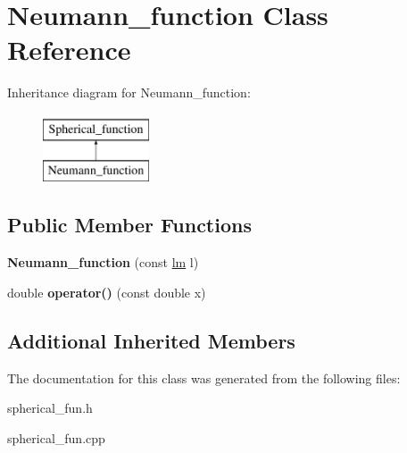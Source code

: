 \hypertarget{classNeumann__function}{}\section{Neumann\+\_\+function Class Reference}
\label{classNeumann__function}
Inheritance diagram for Neumann\+\_\+function\+:\begin{figure}[H]
\begin{center}
\leavevmode
\includegraphics[height=2.000000cm]{classNeumann__function}
\end{center}
\end{figure}
\subsection*{Public Member Functions}
\begin{DoxyCompactItemize}
\item 
\mbox{\label{classNeumann__function_aa4aefbe0c19a40d5aa39f4a5d5c23473}} 
{\bfseries Neumann\+\_\+function} (const \hyperlink{structlm}{lm} l)
\item 
\mbox{\label{classNeumann__function_a423faa23869a1e6c1071ccc8e35a2258}} 
double {\bfseries operator()} (const double x)
\end{DoxyCompactItemize}
\subsection*{Additional Inherited Members}


The documentation for this class was generated from the following files\+:\begin{DoxyCompactItemize}
\item 
spherical\+\_\+fun.\+h\item 
spherical\+\_\+fun.\+cpp\end{DoxyCompactItemize}
